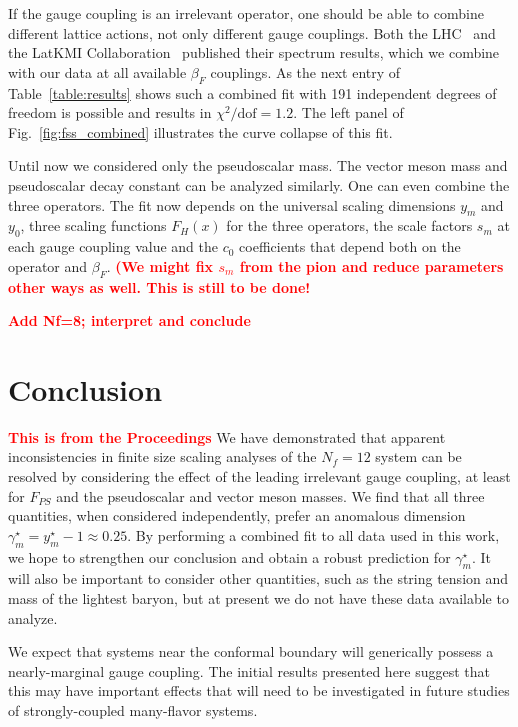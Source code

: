 \documentclass[prl, letterpaper, amsmath, amssymb, preprintnumbers, showpacs, superscriptaddress, twocolumn]{revtex4-1}
\newcommand{\be}{\ensuremath{\beta} }
\newcommand{\ga}{\ensuremath{\gamma} }
\newcommand{\chiSqdof}{\ensuremath{\chi^2 / \mbox{dof}} }
\newcommand{\fig}[1]{Fig.~\ref{#1}}
\newcommand{\TODO}[1]{\textcolor{red}{{\bf #1}}}
\begin{document}
If the gauge coupling is an irrelevant operator, one should be able to combine different lattice actions, not only different gauge couplings.
Both the LHC~\cite{Fodor:2011tu} and the LatKMI Collaboration~\cite{Aoki:2012eq} published their spectrum results, which we combine with our data at all available $\be_F$ couplings.
As the next entry of Table~\ref{table:results} shows such a combined fit with 191 independent degrees of freedom is possible and results in $\chiSqdof = 1.2$.
The left panel of \fig{fig:fss_combined} illustrates the curve collapse of this fit.

Until now we considered only the pseudoscalar mass.
The vector meson mass and pseudoscalar decay constant can be analyzed similarly.
One can even combine the three operators.
The fit now depends on the universal scaling dimensions $y_m$ and $y_0$, three scaling functions $F_H(x)$ for the three operators, the scale factors $s_m$ at each gauge coupling value and the $c_0$ coefficients that depend both on the operator and $\be_F$.
\TODO{(We might fix $s_m$ from the pion and reduce parameters other ways as well.  This is still to be done!}

\TODO{Add Nf=8; interpret and conclude}



\section{Conclusion}
\TODO{This is from the Proceedings}
We have demonstrated that apparent inconsistencies in finite size scaling analyses of the $N_f = 12$ system can be resolved by considering the effect of the leading irrelevant gauge coupling, at least for $F_{PS}$ and the pseudoscalar and vector meson masses.
We find that all three quantities, when considered independently, prefer an anomalous dimension $\ga_m^{\star} = y_m^{\star} - 1 \approx 0.25$.
By performing a combined fit to all data used in this work, we hope to strengthen our conclusion and obtain a robust prediction for $\ga_m^{\star}$.
It will also be important to consider other quantities, such as the string tension and mass of the lightest baryon, but at present we do not have these data available to analyze.

We expect that systems near the conformal boundary will generically possess a nearly-marginal gauge coupling.
The initial results presented here suggest that this may have important effects that will need to be investigated in future studies of strongly-coupled many-flavor systems.
\end{document}

